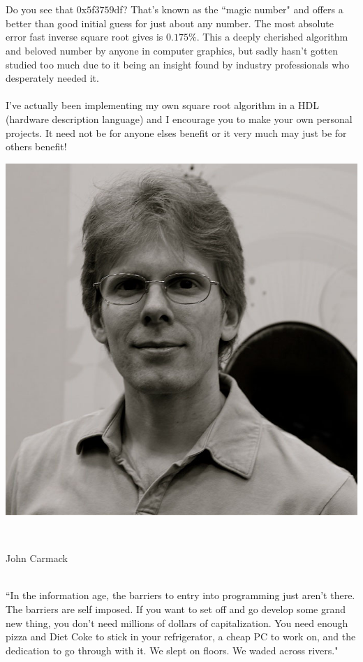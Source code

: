 \documentclass[12pt]{article}
\begin{document}
\\\\Do you see that 0x$5$f$3759$df? That's known as the ``magic number" and offers a better than good initial guess for just about any number. The most absolute error fast inverse square root gives is $0.175\%$. This a deeply cherished algorithm and beloved number by anyone in computer graphics, but sadly hasn't gotten studied too much due to it being an insight found by industry professionals who desperately needed it.\\\\
I've actually been implementing my own square root algorithm in a HDL (hardware description language) and I encourage you to make your own personal projects. It need not be for anyone elses benefit or it very much may just be for others benefit!\\
\centerline{\includegraphics[scale =0.08]{jc.jpg}}\\
\centerline{John Carmack}
\\``In the information age, the barriers to entry into programming just aren't there. The barriers are self imposed. If you want to set off and go develop some grand new thing, you don't need millions of dollars of capitalization. You need enough pizza and Diet Coke to stick in your refrigerator, a cheap PC to work on, and the dedication to go through with it. We slept on floors. We waded across rivers."\\ 
\end{document}
